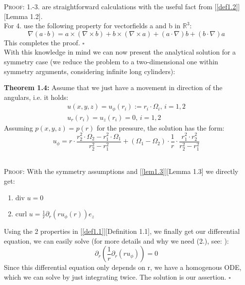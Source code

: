 \documentclass[12pt,a4paper]{report}
\newcommand*{\QEDB}{\null\nobreak\hfill\ensuremath{\square}}
\begin{document}
\textsc{Proof:} 1.-3. are straightforward calculations with the useful fact from [\ref{def1.2}][Lemma 1.2].\\
For 4. use the following property for vectorfields a and b in \(\mathbb{R}^3\):
\begin{equation}
    \nabla(a \cdot b) = a \times (\nabla \times b) + b \times (\nabla \times a) + (a \cdot \nabla)b + (b \cdot \nabla)a
\end{equation}
This completes the proof. \QEDB\\
\newpage
With this knowledge in mind we can now present the analytical solution for a symmetry case (we reduce the problem to a two-dimensional one within symmetry arguments, considering infinite long cylinders):\\
\colorbox{theored}{\begin{minipage}{15cm}{\textcolor{black}{}}
\textbf{Theorem 1.4:} Assume that we just have a movement in direction of the angulars, i.e. it holds:
\begin{equation}
\begin{array}{l}
    u(x,y,z) = u_{\phi}(r_i) := r_i \cdot \Omega_i,\, i=1,2\\
    u_r(r_i) = u_z(r_i) = 0,\, i=1,2
\end{array}
\end{equation}
Assuming \(p(x,y,z)=p(r)\) for the pressure, the solution has the form:
\begin{equation}
    u_{\phi} = r \cdot \frac{r_2^2\cdot \Omega_2 - r_1^2\cdot \Omega_1}{r_2^2 - r_1^2} + (\Omega_1 - \Omega_2)\cdot \frac{1}{r} \cdot \frac{r_1^2 \cdot r_2^2}{r_2^2 - r_1^2}
\end{equation}
\end{minipage}}\\

\textsc{Proof:} With the symmetry assumptions and [\ref{lem1.3}][Lemma 1.3] we directly get:
\begin{enumerate}
    \item $\text{div }u = 0$
    \item $\text{curl }u = \frac{1}{r}\partial_r(ru_{\phi}(r))e_z$
\end{enumerate}
Using the 2 properties in [\ref{def1.1}][Definition 1.1], we finally get our differential equation, we can easily solve (for more details and why we need (2.), see: \cite{solproof}):
\begin{equation}
    \partial_r(\frac{1}{r}\partial_r(ru_{\phi})) = 0
\end{equation}
Since this differential equation only depends on r, we have a homogenous ODE, which we can solve by just integrating twice. The solution is our assertion. \QEDB\\
\end{document}
